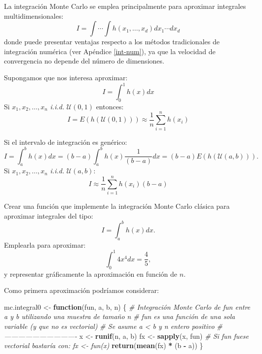 \documentclass[
]{book}
\newenvironment{Shaded}{\begin{snugshade}}{\end{snugshade}}
\newcommand{\CommentTok}[1]{\textcolor[rgb]{0.56,0.35,0.01}{\textit{#1}}}
\newcommand{\ControlFlowTok}[1]{\textcolor[rgb]{0.13,0.29,0.53}{\textbf{#1}}}
\newcommand{\KeywordTok}[1]{\textcolor[rgb]{0.13,0.29,0.53}{\textbf{#1}}}
\newcommand{\NormalTok}[1]{#1}
\newcommand{\OperatorTok}[1]{\textcolor[rgb]{0.81,0.36,0.00}{\textbf{#1}}}
\newcommand{\StringTok}[1]{\textcolor[rgb]{0.31,0.60,0.02}{#1}}
\theoremstyle{break}
\theoremstyle{definition}
\theoremstyle{definition}
\theoremstyle{definition}
\theoremstyle{remark}
\let\BeginKnitrBlock\begin \let\EndKnitrBlock\end
\begin{document}
La integración Monte Carlo se emplea principalmente para aproximar integrales multidimensionales:
\[I = \int \cdots \int h\left( x_1,\ldots ,x_d\right) dx_1 \cdots dx_d\]
donde puede presentar ventajas respecto a los métodos tradicionales de integración numérica (ver Apéndice \ref{int-num}),
ya que la velocidad de convergencia no depende del número de dimensiones.

Supongamos que nos interesa aproximar:
\[I = \int_0^1h\left( x\right) dx\]
Si \(x_1,x_2,\ldots ,x_n\) \emph{i.i.d.} \(\mathcal{U}\left( 0,1\right)\)
entonces:
\[I = E\left( h\left( \mathcal{U}\left( 0,1\right) \right) \right)
\approx \frac{1}{n}\sum\limits_{i=1}^nh\left( x_i\right)\]

Si el intervalo de integración es
genérico:
\[I = \int_a^bh\left( x\right) dx = 
(b-a)\int_a^bh\left( x\right) \frac1{(b-a)}dx = 
(b-a)E\left( h\left( \mathcal{U}\left( a, b \right) \right) \right).\]
Si \(x_1,x_2,\ldots ,x_n\) \emph{i.i.d.}
\(\mathcal{U}\left( a, b\right)\):
\[I\approx \frac{1}{n}\sum\limits_{i=1}^nh\left( x_i\right) (b-a)\]

\BeginKnitrBlock{exercise}
\protect\hypertarget{exr:mc-integral-clas}{}{\label{exr:mc-integral-clas} }

Crear una función que implemente la integración Monte Carlo clásica
para aproximar integrales del tipo:
\[I = \int_a^b h(x)  dx.\]
Emplearla para aproximar:
\[\int_0^1 4x^4 dx = \frac{4}{5},\]
y representar gráficamente la aproximación en función de \(n\).\\
\EndKnitrBlock{exercise}

Como primera aproximación podríamos considerar:

\begin{Shaded}
\begin{Highlighting}[]
\NormalTok{mc.integral0 <-}\StringTok{ }\ControlFlowTok{function}\NormalTok{(fun, a, b, n) \{}
  \CommentTok{# Integración Monte Carlo de fun entre a y b utilizando una muestra de tamaño n}
  \CommentTok{# fun es una función de una sola variable (y que no es vectorial)}
  \CommentTok{# Se asume a < b y n entero positivo}
  \CommentTok{# -------------------------------}
\NormalTok{  x <-}\StringTok{ }\KeywordTok{runif}\NormalTok{(n, a, b)}
\NormalTok{  fx <-}\StringTok{ }\KeywordTok{sapply}\NormalTok{(x, fun) }\CommentTok{# Si fun fuese vectorial bastaría con: fx <- fun(x)}
  \KeywordTok{return}\NormalTok{(}\KeywordTok{mean}\NormalTok{(fx) }\OperatorTok{*}\StringTok{ }\NormalTok{(b }\OperatorTok{-}\StringTok{ }\NormalTok{a))}
\NormalTok{\}}
\end{Highlighting}
\end{Shaded}
\end{document}
